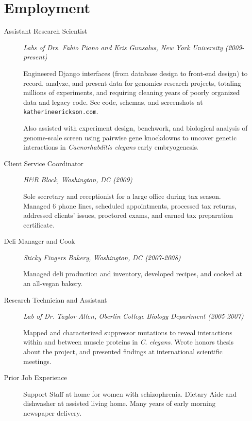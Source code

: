 \documentclass{article}
\newcommand{\website}{\texttt{katherineerickson.com}}
\begin{document}
  \section*{Employment}
  \begin{description}
    \item[Assistant Research Scientist]
    \emph{Labs of Drs. Fabio Piano and Kris Gunsalus, New York University
    (2009-present)}

    Engineered Django interfaces (from database design to front-end
    design) to record, analyze, and present data for genomics research projects,
    totaling millions of experiments, and requiring cleaning years of
    poorly organized data and legacy code.
    See code, schemas, and screenshots at \website.

    Also assisted with experiment design, benchwork, and biological analysis of
    genome-scale screen using pairwise gene knockdowns to uncover
    genetic interactions in \emph{Caenorhabditis elegans} early embryogenesis.

    \item[Client Service Coordinator]
    \emph{H\&R Block, Washington, DC (2009)}

    Sole secretary and receptionist for a large office during tax season.
    Managed 6 phone lines, scheduled appointments, processed tax returns,
    addressed clients' issues, proctored exams, and earned tax preparation
    certificate.

    \item[Deli Manager and Cook]
    \emph{Sticky Fingers Bakery, Washington, DC (2007-2008)}

    Managed deli production and inventory, developed recipes,
    and cooked at an all-vegan bakery.

    \item[Research Technician and Assistant]
    \emph{Lab of Dr. Taylor Allen, Oberlin College Biology Department
        (2005-2007)}

    Mapped and characterized suppressor mutations to reveal interactions
    within and between muscle proteins in \emph{C. elegans}.
    Wrote honors thesis about the project,
    and presented findings at international scientific meetings.

    \item[Prior Job Experience]
    Support Staff at home for women with schizophrenia.
    Dietary Aide and dishwasher at assisted living home.
    Many years of early morning newspaper delivery.
  \end{description}
\end{document}

